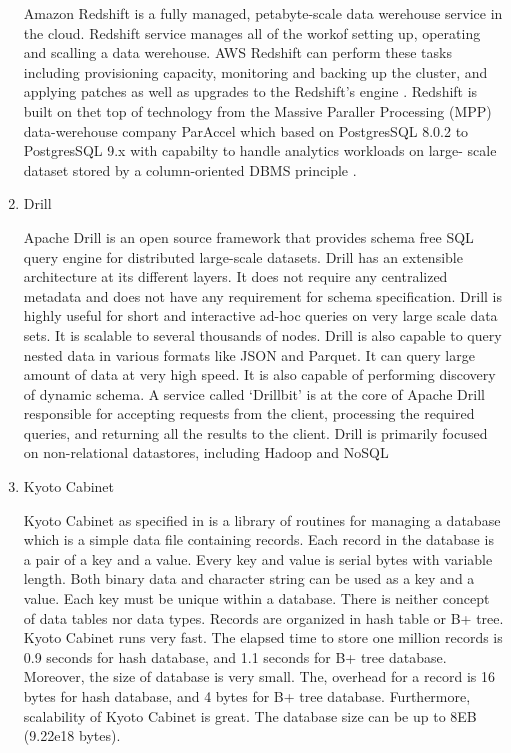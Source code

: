 \begin{enumerate}
Amazon Redshift is a fully managed, petabyte-scale data werehouse
service in the cloud. Redshift service manages all of the workof
setting up, operating and scalling a data werehouse. AWS Redshift
can perform these tasks including provisioning capacity,
monitoring and backing up the cluster, and applying patches as
well as upgrades to the Redshift's engine \label{\detokenize{i524/technologies:id241}}{\hyperref[\detokenize{i524/technologies:www-redshift}]{\sphinxcrossref{{[}202{]}}}}.
Redshift is built on thet top of technology from the Massive
Paraller Processing (MPP) data-werehouse company ParAccel which
based on PostgresSQL 8.0.2 to PostgresSQL 9.x with capabilty to
handle analytics workloads on large- scale dataset stored by a
column-oriented DBMS principle \label{\detokenize{i524/technologies:id242}}{\hyperref[\detokenize{i524/technologies:www-wiki-red}]{\sphinxcrossref{{[}203{]}}}}.

\item {} 
Drill

Apache Drill \label{\detokenize{i524/technologies:id243}}{\hyperref[\detokenize{i524/technologies:www-apachedrill}]{\sphinxcrossref{{[}204{]}}}} is an open source framework
that provides schema free SQL query engine for distributed
large-scale datasets. Drill has an extensible architecture at
its different layers. It does not require any centralized
metadata and does not have any requirement for schema
specification. Drill is highly useful for short and interactive
ad-hoc queries on very large scale data sets. It is scalable to
several thousands of nodes. Drill is also capable to query
nested data in various formats like JSON and Parquet. It can
query large amount of data at very high speed. It is also
capable of performing discovery of dynamic schema.
A service called ‘Drillbit’  is at the core of Apache Drill
responsible for accepting requests from the client, processing
the required queries, and returning all the results to the client.
Drill is primarily focused on non-relational datastores,
including Hadoop and NoSQL

\item {} 
Kyoto Cabinet

Kyoto Cabinet as specified in \label{\detokenize{i524/technologies:id244}}{\hyperref[\detokenize{i524/technologies:www-kyotocabinet}]{\sphinxcrossref{{[}205{]}}}} is a
library of routines for managing a database which is a simple
data file containing records. Each record in the database is a
pair of a key and a value. Every key and value is serial bytes
with variable length. Both binary data and character string can
be used as a key and a value. Each key must be unique within a
database.  There is neither concept of data tables nor data
types. Records are organized in hash table or B+ tree. Kyoto
Cabinet runs very fast. The elapsed time to store one million
records is 0.9 seconds for hash database, and 1.1 seconds for B+
tree database. Moreover, the size of database is very small. The,
overhead for a record is 16 bytes for hash database, and 4 bytes
for B+ tree database. Furthermore, scalability of Kyoto Cabinet
is great. The database size can be up to 8EB (9.22e18 bytes).


\end{enumerate}
